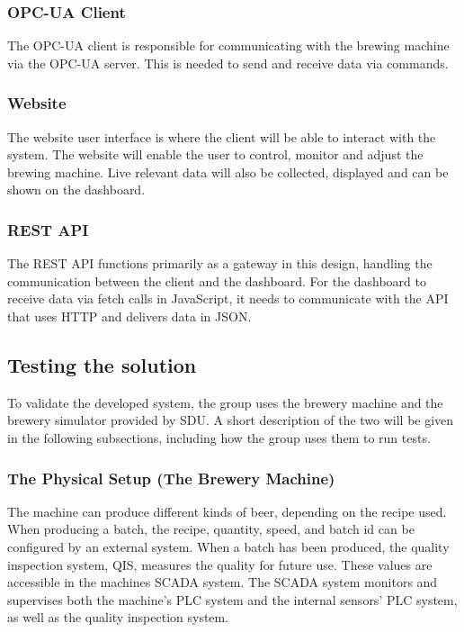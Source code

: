 \subsubsection{OPC-UA Client}
The OPC-UA client is responsible for communicating with the brewing machine via
the OPC-UA server. This is needed to send and receive data via
commands.

\subsubsection{Website}
The website user interface is where the client will be able to interact with
the system. The website will enable the user to control, monitor and adjust
the brewing machine. Live relevant data will also be collected, displayed and
can be shown on the dashboard.


\subsubsection{REST API}
The REST API functions primarily as a gateway in this design, handling the
communication between the client and the dashboard. For the
dashboard to receive data via fetch calls in JavaScript, it needs to communicate 
with the API that uses HTTP and delivers data in JSON.


\subsection{Testing the solution}
To validate the developed system, the group uses the brewery machine and the
brewery simulator provided by SDU. A short description of the two will be given
in the following subsections, including how the group uses them to run tests.

\subsubsection{The Physical Setup (The Brewery Machine)}
The machine can produce different kinds of beer, depending on the recipe used.
When producing a batch, the recipe, quantity, speed, and batch id can be
configured by an external system. When a batch has been produced, the quality
inspection system, QIS, measures the quality for future use. These values are
accessible in the machines SCADA system. The SCADA system monitors and
supervises both the machine's PLC system and the internal sensors' PLC system,
as well as the quality inspection system.\\

